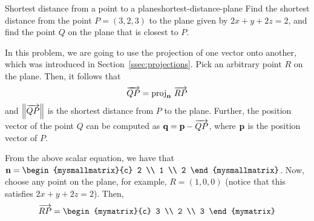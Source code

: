 \begin{example}{Shortest distance from a point to a plane}{shortest-distance-plane}
  Find the shortest distance from the point $P = (3,2,3)$ to the plane
  given by $2x + y + 2z = 2$, and find the point $Q$ on the plane that
  is closest to $P$.%
\end{example}

\begin{solution}
  In this problem, we are going to use the projection of one vector
  onto another, which was introduced in
  Section~\ref{ssec:projections}.  Pick an arbitrary point $R$ on
  the plane. Then, it follows that
  \begin{equation*}
    \longvect{QP} = \proj_{\vect{n}}\,\longvect{RP}
  \end{equation*}
  and $\left\|\overrightarrow{QP}\right\|$ is the shortest distance from $P$ to the
  plane. Further, the position vector of the point $Q$ can be computed
  as $\vect{q} = \vect{p} - \longvect{QP}$, where $\vect{p}$ is the
  position vector of $P$.
  \begin{center}
  \end{center}
  From the above scalar equation, we have that $\vect{n} =
  \begin{mysmallmatrix}{c} 2 \\ 1 \\ 2 \end{mysmallmatrix}$.  Now, choose any
  point on the plane, for example, $R = (1,0,0)$ (notice that this
  satisfies $2x+y+2z=2$).  Then,
  \begin{equation*}
    \longvect{RP} = \begin{mymatrix}{c} 3 \\ 2 \\ 3 \end{mymatrix}

\end{equation*}
\end{solution}
